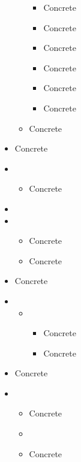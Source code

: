 \begin{itemize}
\begin{itemize}
\begin{itemize}
         \item[\clsnmref{LinIPSimpleCo}] Concrete
         \item[\clsnmref{LinOPSimpleCo}] Concrete
         \item[\clsnmref{OutSimpleCo}] Concrete
         \item[\clsnmref{ScaledTorsSimpleCo}] Concrete
         \item[\clsnmref{StreSimpleCo}] Concrete
         \item[\clsnmref{TorsSimpleCo}] Concrete
       \end{itemize}
     \item[\clsnmref{SumIntCoor}] Concrete
   \end{itemize}
 \item[\clsnmref{IntCoorGen}] Concrete
 \item[\clsnmref{Integral}]
   \begin{itemize}
     \item[\clsnmref{IntegralV3}] Concrete
   \end{itemize}
 \item[\clsnmref{MemoryGrp}]
 \item[\clsnmref{MessageGrp}]
   \begin{itemize}
     \item[\clsnmref{ProcMessageGrp}] Concrete
     \item[\clsnmref{ShmMessageGrp}] Concrete
   \end{itemize}
 \item[\clsnmref{MolecularFrequencies}] Concrete
 \item[\clsnmref{MolecularCoor}]
   \begin{itemize}
     \item[\clsnmref{IntMolecularCoor}]
       \begin{itemize}
         \item[\clsnmref{RedundMolecularCoor}] Concrete
         \item[\clsnmref{SymmMolecularCoor}] Concrete
       \end{itemize}
   \end{itemize}
 \item[\clsnmref{Molecule}] Concrete
 \item[\clsnmref{Optimize}]
   \begin{itemize}
     \item[\clsnmref{EFCOpt}] Concrete
     \item[\clsnmref{LineOpt}]
     \item[\clsnmref{QNewtonOpt}] Concrete

\end{itemize}
\end{itemize}
